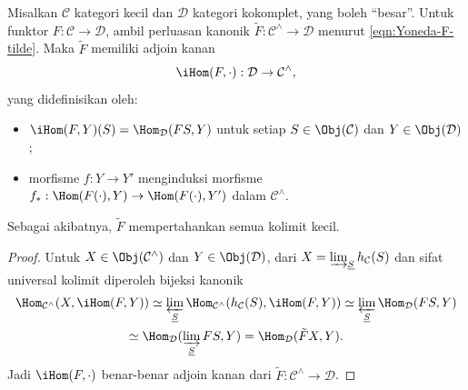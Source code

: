 \begin{proposition}\label{prop:Yoneda-F-tilde}
	Misalkan $\mathcal{C}$ kategori kecil dan $\mathcal{D}$ kategori
	kokomplet, yang boleh ``besar''. Untuk funktor
	$F:\mathcal{C}\to\mathcal{D}$, ambil perluasan kanonik
	$\tilde F:\mathcal{C}^\wedge\to\mathcal{D}$ menurut
	\eqref{eqn:Yoneda-F-tilde}. Maka $\tilde F$ memiliki adjoin kanan
	\[ \iHom(F, \cdot): \mathcal{D} \to \mathcal{C}^\wedge , \]
	yang didefinisikan oleh:
	\begin{itemize}
		\item $\iHom(F,Y)(S)=\Hom_{\mathcal{D}}(FS,Y)$ untuk setiap
		$S\in\Obj(\mathcal{C})$ dan $Y\in\Obj(\mathcal{D})$;
		\item morfisme $f:Y\to Y'$ menginduksi morfisme
		$f_*:\Hom(F(\mathord\cdot),Y)\to
		\Hom(F(\mathord\cdot),Y')$ dalam $\mathcal{C}^\wedge$.
	\end{itemize}
	Sebagai akibatnya, $\tilde F$ mempertahankan semua kolimit kecil.
\end{proposition}
\begin{proof}
	Untuk $X\in\Obj(\mathcal{C}^\wedge)$ dan
	$Y\in\Obj(\mathcal{D})$, dari
	$X=\varinjlim_{\underline S}h_{\mathcal{C}}(S)$ dan sifat universal
	kolimit diperoleh bijeksi kanonik
	\begin{multline*}
		\Hom_{\mathcal{C}^\wedge}(X, \iHom(F, Y)) \simeq \varprojlim_{\underline{S}} \Hom_{\mathcal{C}^\wedge}(h_{\mathcal{C}}(S), \iHom(F, Y)) \simeq \varprojlim_{\underline{S}} \Hom_{\mathcal{D}}(FS, Y) \\
		\simeq \Hom_{\mathcal{D}}(\varinjlim_{\underline{S}} FS, Y ) = \Hom_{\mathcal{D}}(\tilde{F}X, Y).
	\end{multline*}
	Jadi $\iHom(F,\mathord\cdot)$ benar-benar adjoin kanan dari
	$\tilde F:\mathcal{C}^\wedge\to\mathcal{D}$.
\end{proof}
